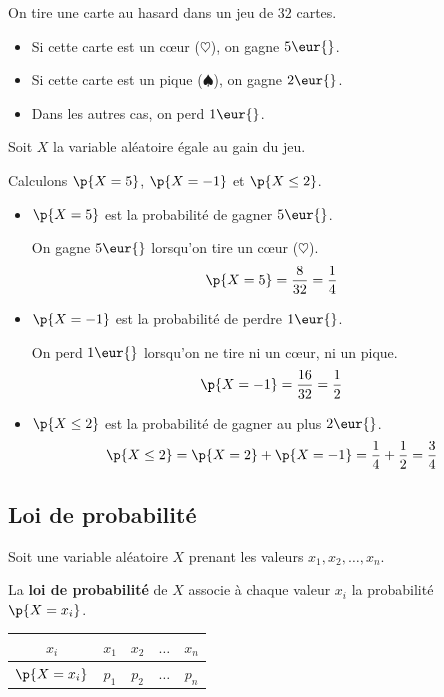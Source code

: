 \begin{methode}
	On tire une carte au hasard dans un jeu de $32$ cartes.

	\begin{itemize}
		\item Si cette carte est un c\oe ur ($\heartsuit$), on gagne $5\eur{}$.
		\item Si cette carte est un pique ($\spadesuit$), on gagne $2\eur{}$.
		\item Dans les autres cas, on perd $1\eur{}$.
	\end{itemize}

	Soit $X$ la variable aléatoire égale au gain du jeu.

	Calculons $\p{X=5}$, $\p{X=-1}$ et $\p{X \le 2}$.

	\begin{correction}
		\nline
		\begin{itemize}
			\item $\p{X=5}$ est la probabilité de gagner $5\eur{}$.

			      On gagne $5\eur{}$ lorsqu'on tire un c\oe ur ($\heartsuit$).
			      \[
				      \p{X=5} = \dfrac{8}{32} = \dfrac{1}{4}
			      \]

			\item $\p{X=-1}$ est la probabilité de perdre $1\eur{}$.

			      On perd $1\eur{}$ lorsqu'on ne tire ni un c\oe ur, ni un pique.
			      \[
				      \p{X=-1} = \dfrac{16}{32} = \dfrac{1}{2}
			      \]

			\item $\p{X \le 2}$ est la probabilité de gagner au plus $2\eur{}$.
			      \[
				      \p{X \le 2} = \p{X=2} + \p{X=-1} = \dfrac{1}{4} + \dfrac{1}{2} = \dfrac{3}{4}
			      \]
		\end{itemize}
	\end{correction}
\end{methode}

\subsection{Loi de probabilité}

\begin{defin}
	Soit une variable aléatoire $X$ prenant les valeurs $x_{1}, x_{2}, \dots, x_{n}$.

	La \textbf{loi de probabilité} de $X$ associe à chaque valeur $x_i$ la probabilité $\p{X=x_{i}}$.

	\begin{center}
		\begin{tabular}{|c|c|c|c|c|} \hline
			\ccg $x_i$       & $x_1$ & $x_2$ & $\dots$ & $x_n$ \\ \hline
			\ccg $\p{X=x_i}$ & $p_1$ & $p_2$ & $\dots$ & $p_n$ \\ \hline
		\end{tabular}
	\end{center}
\end{defin}

